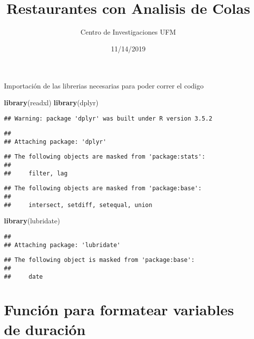 \documentclass[]{article}
\title{Restaurantes con Analisis de Colas}
\author{Centro de Investigaciones UFM}
\date{11/14/2019}
\newenvironment{Shaded}{\begin{snugshade}}{\end{snugshade}}
\newcommand{\KeywordTok}[1]{\textcolor[rgb]{0.13,0.29,0.53}{\textbf{#1}}}
\newcommand{\NormalTok}[1]{#1}
\begin{document}
\maketitle

Importación de las librerias necesarias para poder correr el codigo

\begin{Shaded}
\begin{Highlighting}[]
\KeywordTok{library}\NormalTok{(readxl)}
\KeywordTok{library}\NormalTok{(dplyr)}
\end{Highlighting}
\end{Shaded}

\begin{verbatim}
## Warning: package 'dplyr' was built under R version 3.5.2
\end{verbatim}

\begin{verbatim}
## 
## Attaching package: 'dplyr'
\end{verbatim}

\begin{verbatim}
## The following objects are masked from 'package:stats':
## 
##     filter, lag
\end{verbatim}

\begin{verbatim}
## The following objects are masked from 'package:base':
## 
##     intersect, setdiff, setequal, union
\end{verbatim}

\begin{Shaded}
\begin{Highlighting}[]
\KeywordTok{library}\NormalTok{(lubridate)}
\end{Highlighting}
\end{Shaded}

\begin{verbatim}
## 
## Attaching package: 'lubridate'
\end{verbatim}

\begin{verbatim}
## The following object is masked from 'package:base':
## 
##     date
\end{verbatim}

\hypertarget{funcion-para-formatear-variables-de-duracion}{%
\section{Función para formatear variables de
duración}\label{funcion-para-formatear-variables-de-duracion}}
\end{document}

